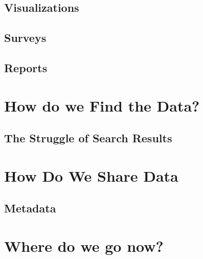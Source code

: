 \documentclass[
]{book}
\begin{document}
\hypertarget{visualizations}{%
\section{Visualizations}\label{visualizations}}

\hypertarget{surveys}{%
\section{Surveys}\label{surveys}}

\hypertarget{reports}{%
\section{Reports}\label{reports}}

\hypertarget{how-do-we-find-data}{%
\chapter{How do we Find the Data?}\label{how-do-we-find-data}}

\hypertarget{the-struggle-of-search-results}{%
\section{The Struggle of Search Results}\label{the-struggle-of-search-results}}

\hypertarget{how-to-share-data}{%
\chapter{How Do We Share Data}\label{how-to-share-data}}

\hypertarget{metadata}{%
\section{Metadata}\label{metadata}}

\hypertarget{where-do-we-go-now}{%
\chapter{Where do we go now?}\label{where-do-we-go-now}}

  
\end{document}
